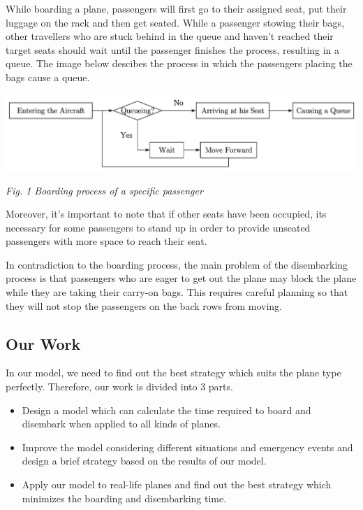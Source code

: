 \documentclass{article}
\theoremstyle{definition}
\theoremstyle{remark}
\numberwithin{equation}{section}
\begin{document}
	While boarding a plane, passengers will first go to their assigned seat, put their luggage on the rack and then get seated. While a passenger stowing their bags, other travellers who are stuck behind in the queue and haven't reached their target seats should wait until the passenger finishes the process, resulting in a queue. The image below descibes the process in which the passengers placing the bags cause a queue.
	
	\begin{center}
		\includegraphics[width=14cm]{chart.jpg}

		\textit{Fig. 1 Boarding process of a specific passenger}
	\end{center}

	Moreover, it's important to note that if other seats have been occupied, its necessary for some passengers to stand up in order to provide unseated passengers with more space to reach their seat.

	In contradiction to the boarding process, the main problem of the disembarking process is that passengers who are eager to get out the plane may block the plane while they are taking their carry-on bags. This requires careful planning so that they will not stop the passengers on the back rows from moving.
	\subsection{Our Work}
	In our model, we need to find out the best strategy which suits the plane type perfectly. Therefore, our work is divided into 3 parts.
	\begin{itemize}
		\item Design a model which can calculate the time required to board and disembark when applied to all kinds of planes.
		\item Improve the model considering different situations and emergency events and design a brief strategy based on the results of our model.
		\item Apply our model to real-life planes and find out the best strategy which minimizes the boarding and disembarking time.
	\end{itemize}
\end{document}
